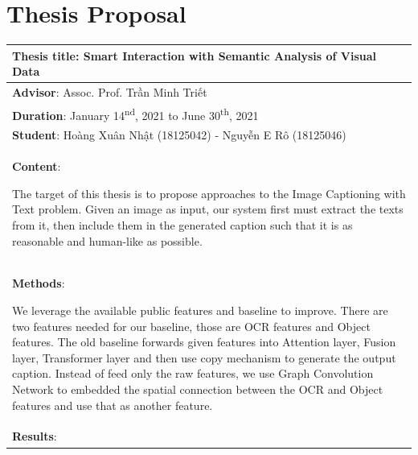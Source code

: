 \chapter{Thesis Proposal}
\begin{longtable}{|p{{{80mm}}}|c|}
\hline
\multicolumn{2}{|m{\linewidth}|}{\textbf{Thesis title}: Smart Interaction with Semantic Analysis of Visual Data }\\
\hline
\multicolumn{2}{|m{\linewidth}|}{\textbf{Advisor}: Assoc. Prof. Trần Minh Triết} \\
\hline
\multicolumn{2}{|m{\linewidth}|}{\textbf{Duration}: January 14\textsuperscript{nd}, 2021 to June 30\textsuperscript{th}, 2021}\\
\hline
\multicolumn{2}{|m{\linewidth}|}{\textbf{Student}: Hoàng Xuân Nhật (18125042) - Nguyễn E Rô (18125046)}\\
\hline

\hline
\multicolumn{2}{|m{\linewidth}|}{\textbf{Content}:\par
The target of this thesis is to propose approaches to the Image Captioning with Text problem. Given an image as input, our system first must extract the texts from it, then include them in the generated caption such that it is as reasonable and human-like as possible.
}\\
\hline
\multicolumn{2}{|m{\linewidth}|}{\textbf{Methods}:\par
We leverage the available public features and baseline to improve. There are two features needed for our baseline, those are OCR features and Object features. The old baseline forwards given features into Attention layer, Fusion layer, Transformer layer and then use copy mechanism to generate the output caption. Instead of feed only the raw features, we use Graph Convolution Network to embedded the spatial connection between the OCR and Object features and use that as another feature.

}\\
\hline
\multicolumn{2}{|m{\linewidth}|}{\textbf{Results}:\par

}
\end{longtable}

